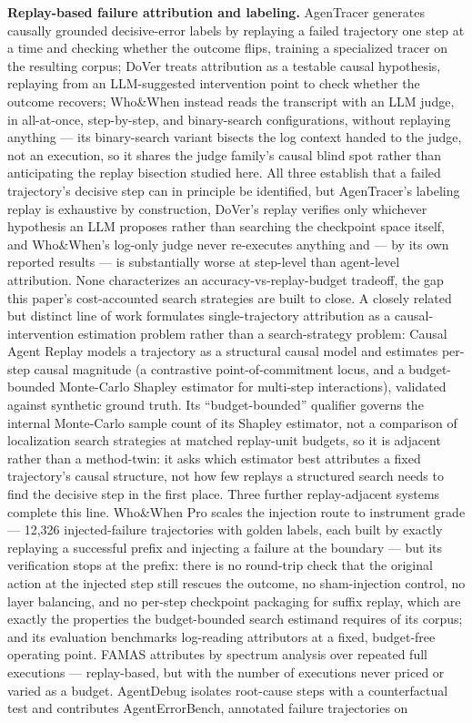 \documentclass[11pt]{article}
\begin{document}
\textbf{Replay-based failure attribution and labeling.} AgenTracer \citep{AgenTracer2025} generates causally grounded decisive-error labels by replaying a failed trajectory one step at a time and checking whether the outcome flips, training a specialized tracer on the resulting corpus; DoVer \citep{DoVer2025} treats attribution as a testable causal hypothesis, replaying from an LLM-suggested intervention point to check whether the outcome recovers; Who\&When \citep{WhoWhen2025} instead reads the transcript with an LLM judge, in all-at-once, step-by-step, and binary-search configurations, without replaying anything --- its binary-search variant bisects the log context handed to the judge, not an execution, so it shares the judge family's causal blind spot rather than anticipating the replay bisection studied here. All three establish that a failed trajectory's decisive step can in principle be identified, but AgenTracer's labeling replay is exhaustive by construction, DoVer's replay verifies only whichever hypothesis an LLM proposes rather than searching the checkpoint space itself, and Who\&When's log-only judge never re-executes anything and --- by its own reported results --- is substantially worse at step-level than agent-level attribution. None characterizes an accuracy-vs-replay-budget tradeoff, the gap this paper's cost-accounted search strategies are built to close. A closely related but distinct line of work formulates single-trajectory attribution as a causal-intervention estimation problem rather than a search-strategy problem: Causal Agent Replay \citep{CausalAgentReplay2606} models a trajectory as a structural causal model and estimates per-step causal magnitude (a contrastive point-of-commitment locus, and a budget-bounded Monte-Carlo Shapley estimator for multi-step interactions), validated against synthetic ground truth. Its ``budget-bounded'' qualifier governs the internal Monte-Carlo sample count of its Shapley estimator, not a comparison of localization search strategies at matched replay-unit budgets, so it is adjacent rather than a method-twin: it asks which estimator best attributes a fixed trajectory's causal structure, not how few replays a structured search needs to find the decisive step in the first place. Three further replay-adjacent systems complete this line. Who\&When Pro \citep{WhoWhenPro2607} scales the injection route to instrument grade --- 12{,}326 injected-failure trajectories with golden labels, each built by exactly replaying a successful prefix and injecting a failure at the boundary --- but its verification stops at the prefix: there is no round-trip check that the original action at the injected step still rescues the outcome, no sham-injection control, no layer balancing, and no per-step checkpoint packaging for suffix replay, which are exactly the properties the budget-bounded search estimand requires of its corpus; and its evaluation benchmarks log-reading attributors at a fixed, budget-free operating point. FAMAS \citep{FAMAS2509} attributes by spectrum analysis over repeated full executions --- replay-based, but with the number of executions never priced or varied as a budget. AgentDebug \citep{AgentDebug2509} isolates root-cause steps with a counterfactual test and contributes AgentErrorBench, annotated failure trajectories on 
\end{document}
